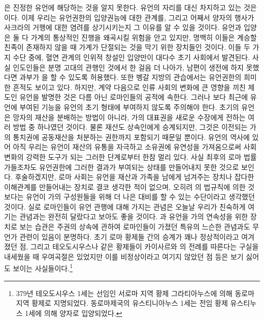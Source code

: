 은 진정한 유언에 해당하는 것을 알지 못한다.
유언의 자리를 대신 차지하고 있는 것은 이다.
이제 우리는 유언권한의 입양권능에 대한 관계를,
그리고 어째서 양자의 행사가 사크라의 거행에 대한 염려를 상기시키는지 그 이유를
알 수 있을 것이다.
유언과 입양은 둘 다 가계의 통상적인 진행을 왜곡시킬
위험을 안고 있지만, 명백히 이들은
계승할 친족이 존재하지 않을 때 가계가 단절되는 것을 막기 위한
장치들인 것이다.
이들 두 가지 수단 중에,
혈연 관계의 인위적 창설인
입양만이
대다수 초기 사회에서 발견된다.
사실 인도인들은 분명 고대의 관행인 것에서 한 걸음 더 나아가,
남편이 생전에 하지 못했다면 과부가 을 할 수 있도록 허용했다.
또한 벵갈 지방의 관습에서는 유언권한의 희미한 흔적도 보이고 있다.
하지만,
계약 다음으로 인류 사회의 변화에 큰 영향을 끼친 제도인
유언을 발명한 것은 다름 아닌 로마인들의 공적에 속한다.
그러나
보다 최근에 유언에 부여된 기능을
유언의 초기 형태에 부여하지 않도록 주의해야 한다.
초기의 유언은 망자의 재산을 분배하는 방법이 아니라,
가의 대표권을 새로운 수장에게 전하는 여러 방법 중 하나였던 것이다.
물론 재산도 상속인에게 승계되지만,
그것은 이전되는 가의 통치권에
공동재산을 처분하는 권한까지 포함되기 때문일 뿐이다.
유언의 역사에 있어
아직 우리는
유언이
재산의 유통을 자극하고
소유권에 유연성을 가져옴으로써
사회 변화의
강력한 도구가 되는 그러한 단계로부터 한참 멀리 있다.
사실 최후의 로마 법률가들조차도
유언권한에 그러한 결과가 부여되는 상태를 만들어내지 못한 것으로 보인다.
후술하겠지만,
로마 사회는 유언을
재산과 가족을 남에게 넘겨주는 장치나
잡다한 이해관계를 만들어내는 장치로
결코 생각한 적이 없으며, 오히려
의 법규칙에 의한 것보다는 유언이
가의 구성원들을 위해 더 나은 대비를 할 수 있는 수단이라고
생각했던 것이다.
실로 로마인들이 유언 관행에 대해 가지는 관념은
오늘날 우리가 친숙하게 여기는 관념과는 완전히 달랐다고 보아도 좋을 것이다.
과 유언을 가의 연속성을 위한 장치로 보는 습관은
주권의 상속에 관하여 로마인들이 가졌던 특유의 느슨한 관념과도
무언가 관련이 있음이 분명하다.
초기 로마 황제들 간의 승계가 꽤나 정상적이라고 여겨졌던 점,
그리고 테오도시우스나
 같은 황제들이 카이사르와 의 전례를
따른다는 구실을 내세웠을 때
우여곡절은 있었지만
이를 비정상이라고 여기지 않았던 점 등은
보기 싫어도 보이는 사실들이다.\footnote{%
  379년 테오도시우스 1세는 선임인 서로마 지역 황제 그라티아누스에 의해
  동로마 지역 황제로 지명되었다.
  동로마제국의 유스티니아누스 1세는 전임 황제 유스티누스 1세에 의해
  양자로 입양되었다.}

